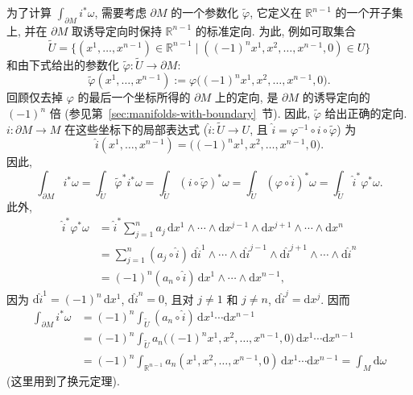 \begin{RiemannProof}
为了计算 $\int_{\partial M}i^*\omega$, 需要考虑 $\partial M$ 的一个参数化 $\widetilde\varphi$, 它定义在 $\mathbb{R}^{n-1}$ 的一个开子集上, 并在 $\partial M$ 取诱导定向时保持 $\mathbb{R}^{n-1}$ 的标准定向. 为此, 例如可取集合
\[
  \widetilde U=\{(x^1,\ldots,x^{n-1})\in\mathbb{R}^{n-1}\mid
  ((-1)^nx^1,x^2,\ldots,x^{n-1},0)\in U\}
\]
和由下式给出的参数化 $\widetilde\varphi:\widetilde U\to\partial M$:
\[
  \widetilde\varphi(x^1,\ldots,x^{n-1})
    :=\varphi\bigl((-1)^nx^1,x^2,\ldots,x^{n-1},0\bigr).
\]
回顾仅去掉 $\varphi$ 的最后一个坐标所得的 $\partial M$ 上的定向, 是 $\partial M$ 的诱导定向的 $(-1)^n$ 倍 (参见第~\ref{sec:manifolds-with-boundary}~节). 因此, $\widetilde\varphi$ 给出正确的定向. $i:\partial M\to M$ 在这些坐标下的局部表达式 ($\widehat i:\widetilde U\to U$, 且 $\widehat i=\varphi^{-1}\circ i\circ\widetilde\varphi$) 为
\[
  \widehat i(x^1,\ldots,x^{n-1})
    =\bigl((-1)^nx^1,x^2,\ldots,x^{n-1},0\bigr).
\]
因此,
\[
  \int_{\partial M}i^*\omega
  =\int_{\widetilde U}\widetilde\varphi^*i^*\omega
  =\int_{\widetilde U}(i\circ\widetilde\varphi)^*\omega
  =\int_{\widetilde U}(\varphi\circ\widehat i)^*\omega
  =\int_{\widetilde U}\widehat i^*\varphi^*\omega.
\]
此外,
\begin{align*}
  \widehat i^*\varphi^*\omega
  &=\widehat i^*\sum_{j=1}^na_j\,\mathrm{d}x^1\wedge\cdots\wedge
    \mathrm{d}x^{j-1}\wedge\mathrm{d}x^{j+1}\wedge\cdots\wedge\mathrm{d}x^n\\
  &=\sum_{j=1}^n(a_j\circ\widehat i)\,\mathrm{d}\widehat i^1\wedge\cdots\wedge
    \mathrm{d}\widehat i^{j-1}\wedge\mathrm{d}\widehat i^{j+1}\wedge\cdots\wedge\mathrm{d}\widehat i^n\\
  &=(-1)^n(a_n\circ\widehat i)\,\mathrm{d}x^1\wedge\cdots\wedge\mathrm{d}x^{n-1},
\end{align*}
因为 $\mathrm{d}\widehat i^1=(-1)^n\,\mathrm{d}x^1$, $\mathrm{d}\widehat i^n=0$, 且对 $j\ne1$ 和 $j\ne n$, $\mathrm{d}\widehat i^j=\mathrm{d}x^j$. 因而
\begin{align*}
  \int_{\partial M}i^*\omega
  &=(-1)^n\int_{\widetilde U}(a_n\circ\widehat i)\,\mathrm{d}x^1\cdots\mathrm{d}x^{n-1}\\
  &=(-1)^n\int_{\widetilde U}a_n\bigl((-1)^nx^1,x^2,\ldots,x^{n-1},0\bigr)
    \,\mathrm{d}x^1\cdots\mathrm{d}x^{n-1}\\
  &=(-1)^n\int_{\mathbb{R}^{n-1}}a_n(x^1,x^2,\ldots,x^{n-1},0)
    \,\mathrm{d}x^1\cdots\mathrm{d}x^{n-1}=\int_M\mathrm{d}\omega
\end{align*}
(这里用到了换元定理).
\end{RiemannProof}

